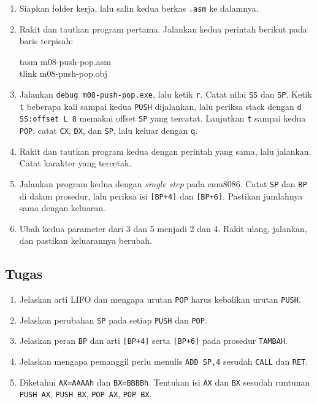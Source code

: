 \begin{enumerate}
    \item Siapkan folder kerja, lalu salin kedua berkas \texttt{.asm}
          ke dalamnya.
    \item Rakit dan tautkan program pertama. Jalankan kedua perintah
          berikut pada baris terpisah:
          \begin{perintah}
tasm m08-push-pop.asm\\
tlink m08-push-pop.obj
\end{perintah}
    \item Jalankan \texttt{debug m08-push-pop.exe}, lalu ketik
          \texttt{r}. Catat nilai \texttt{SS} dan \texttt{SP}. Ketik
          \texttt{t} beberapa kali sampai kedua \texttt{PUSH}
          dijalankan, lalu periksa stack dengan
          \texttt{d SS:offset L 8} memakai offset \texttt{SP} yang
          tercatat. Lanjutkan \texttt{t} sampai kedua \texttt{POP},
          catat \texttt{CX}, \texttt{DX}, dan \texttt{SP}, lalu keluar
          dengan \texttt{q}.
    \item Rakit dan tautkan program kedua dengan perintah yang sama,
          lalu jalankan. Catat karakter yang tercetak.
    \item Jalankan program kedua dengan \emph{single step} pada
          emu8086. Catat \texttt{SP} dan \texttt{BP} di dalam
          prosedur, lalu periksa isi \texttt{[BP+4]} dan
          \texttt{[BP+6]}. Pastikan jumlahnya sama dengan keluaran.
    \item Ubah kedua parameter dari 3 dan 5 menjadi 2 dan 4. Rakit
          ulang, jalankan, dan pastikan keluarannya berubah.
\end{enumerate}

\subsection{Tugas}

\begin{enumerate}
    \item Jelaskan arti LIFO dan mengapa urutan \texttt{POP} harus
          kebalikan urutan \texttt{PUSH}.
    \item Jelaskan perubahan \texttt{SP} pada setiap \texttt{PUSH} dan
          \texttt{POP}.
    \item Jelaskan peran \texttt{BP} dan arti \texttt{[BP+4]} serta
          \texttt{[BP+6]} pada prosedur \texttt{TAMBAH}.
    \item Jelaskan mengapa pemanggil perlu menulis \texttt{ADD SP,4}
          sesudah \texttt{CALL} dan \texttt{RET}.
    \item Diketahui \texttt{AX=AAAAh} dan \texttt{BX=BBBBh}. Tentukan
          isi \texttt{AX} dan \texttt{BX} sesudah runtunan
          \texttt{PUSH AX}, \texttt{PUSH BX}, \texttt{POP AX},
          \texttt{POP BX}.
\end{enumerate}

